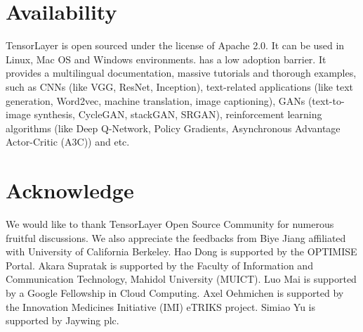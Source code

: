 \section{Availability}
TensorLayer is open sourced under the license of Apache 2.0.
It can be used in Linux, Mac OS and Windows environments.
\tl has a low adoption barrier. It provides a multilingual documentation, massive tutorials and thorough examples, such as CNNs (like VGG, ResNet, Inception), text-related applications (like text generation, Word2vec, machine translation, image captioning), GANs (text-to-image synthesis, CycleGAN, stackGAN, SRGAN), reinforcement learning algorithms (like Deep Q-Network, Policy Gradients, Asynchronous Advantage Actor-Critic (A3C)) and etc.

\section{Acknowledge}
We would like to thank TensorLayer Open Source Community for numerous fruitful discussions. We also appreciate the feedbacks from Biye Jiang affiliated with University of California Berkeley.
Hao Dong is supported by the OPTIMISE Portal. Akara Supratak is supported by the Faculty of Information and Communication Technology, Mahidol University (MUICT). Luo Mai is supported by a Google Fellowship in Cloud Computing. Axel Oehmichen is supported by the Innovation Medicines Initiative (IMI) eTRIKS project. Simiao Yu is supported by Jaywing plc. 


